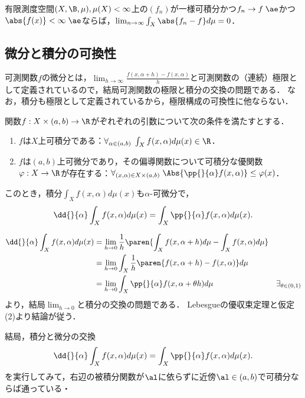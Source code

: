 \documentclass[uplatex, dvipdfmx]{jsreport}
\begin{document}
\begin{theorem}[Vitali]
    有限測度空間$(X,\B,\mu),\mu(X)<\infty$上の$(f_n)$が一様可積分かつ$f_n\to f\;\ae$かつ$\abs{f(x)}<\infty\;\ae$ならば，$\lim_{n\to\infty}\int_X\abs{f_n-f}d\mu=0$．
\end{theorem}

\subsection{微分と積分の可換性}

\begin{tcolorbox}[colframe=ForestGreen, colback=ForestGreen!10!white,breakable,colbacktitle=ForestGreen!40!white,coltitle=black,fonttitle=\bfseries\sffamily,
title=]
    可測関数$f$の微分とは，$\lim_{h\to\infty}\frac{f(x,\alpha+h)-f(x,\alpha)}{h}$と可測関数の（連続）極限として定義されているので，結局可測関数の極限と積分の交換の問題である．
    なお，積分も極限として定義されているから，極限構成の可換性に他ならない．
\end{tcolorbox}

\begin{theorem}
    関数$f:X\times(a,b)\to\R$がぞれぞれの引数について次の条件を満たすとする．
    \begin{enumerate}
        \item $f$は$X$上可積分である：$\forall_{\alpha\in(a,b)}\;\int_Xf(x,\alpha)d\mu(x)\in\R$．
        \item $f$は$(a,b)$上可微分であり，その偏導関数について可積分な優関数$\varphi:X\to\R$が存在する：$\forall_{(x,\alpha)\in X\times(a,b)}\;\Abs{\pp{}{\alpha}f(x,\alpha)}\le \varphi(x)$．
    \end{enumerate}
    このとき，積分$\int_Xf(x,\alpha)d\mu(x)$も$\alpha$-可微分で，
    \[\dd{}{\alpha}\int_Xf(x,\alpha)d\mu(x)=\int_X\pp{}{\alpha}f(x,\alpha)d\mu(x).\]
\end{theorem}
\begin{Proof}
    \begin{align*}
        \dd{}{\alpha}\int_Xf(x,\alpha)d\mu(x)&=\lim_{h\to0}\frac{1}{h}\paren{\int_Xf(x,\alpha+h)d\mu-\int_Xf(x,\alpha)d\mu}\\
        &=\lim_{h\to0}\int_X\frac{1}{h}\paren{f(x,\alpha+h)-f(x,\alpha)}d\mu\\
        &=\lim_{h\to0}\int_X\pp{}{\alpha}f(x,\alpha+\theta h)d\mu&\exists_{\theta\in(0,1)}
    \end{align*}
    より，結局$\lim_{h\to0}$と積分の交換の問題である．
    Lebesgueの優収束定理と仮定(2)より結論が従う．
\end{Proof}
\begin{remarks}[計算できたらOKである]
    結局，積分と微分の交換
    \[\dd{}{\alpha}\int_Xf(x,\alpha)d\mu(x)=\int_X\pp{}{\alpha}f(x,\alpha)d\mu(x).\]
    を実行してみて，右辺の被積分関数が$\al$に依らずに近傍$\al\in(a,b)$で可積分ならば通っている・
\end{remarks}
\end{document}
